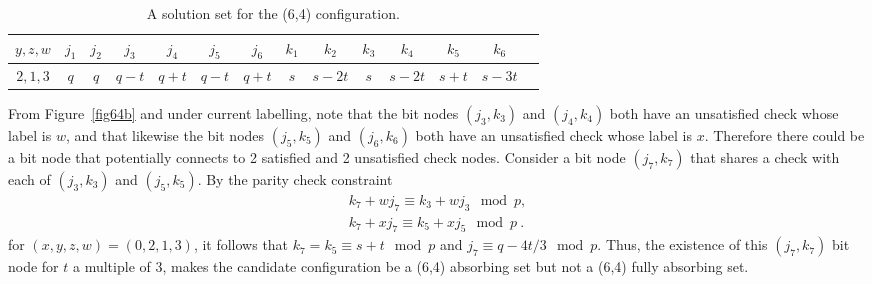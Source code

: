\hspace{-0.2in}\small{\hspace{-0.2in}\begin{table}[ht]\vspace{-0.05in}\hspace{-0.2in}
\begin{tabular}{|c |c|c|c|c|c|c|c|c|c|c|c|c|c|}
  \hline
  $y,z,w$ & $j_1$ & $j_2$ & $j_3$ & $j_4$ & $j_5$ & $j_6$ & $k_1$ & $k_2$ & $k_3$ & $k_4$ & $k_5$ & $k_6$ \\
  \hline
$2,1,3$&  $q$ & $q$ &  $q-t$ &  $q+t$ &  $q-t$ & $q+t$ & $s$ &
$s-2t$ & $s$ & $s-2t$ & $s+t$ &
  $s-3t$\\
   \hline
\end{tabular}
\caption{ A solution set for the (6,4)
configuration.}\label{table64c}
\end{table}}
\normalsize

From Figure~\ref{fig64b} and under current labelling, note that
the bit nodes $(j_3,k_3)$ and $(j_4,k_4)$ both have an unsatisfied
check whose label is $w$, and that likewise the bit nodes
$(j_5,k_5)$ and $(j_6,k_6)$ both have an unsatisfied check whose
label is $x$. Therefore there could be a bit node that potentially
connects to 2 satisfied and 2 unsatisfied check nodes. Consider a
bit node $(j_7,k_7)$ that shares a check with each of $(j_3,k_3)$
and $(j_5,k_5)$. By the parity check constraint
\begin{eqnarray*}
k_7 +wj_7 \equiv k_3+wj_3 \mod p,\\
k_7 +xj_7 \equiv k_5+xj_5 \mod p~.
\end{eqnarray*}
for $(x,y,z,w)=(0,2,1,3)$, it follows that $k_7=k_5 \equiv s +t
\mod p$ and $j_7 \equiv q-4t/3 \mod p$. Thus, the existence of
this $(j_7,k_7)$ bit node for $t$  a multiple of 3, makes the
candidate configuration be a (6,4) absorbing set but not a (6,4)
fully absorbing set.



